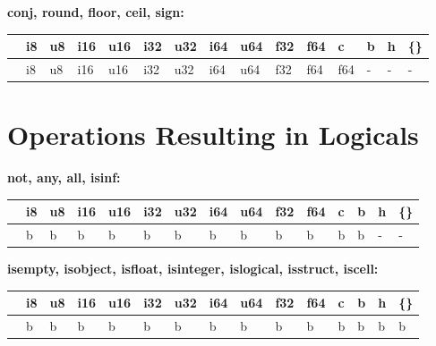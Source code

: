 \textbf{conj, round, floor, ceil, sign:}
\begin{scriptsize}\begin{tt}\begin{center}\vspace{-.3cm}\begin{tabular}{|m{.65cm}||m{.65cm}|m{.65cm}|m{.65cm}|m{.65cm}|m{.65cm}|m{.65cm}|m{.65cm}|m{.65cm}|m{.65cm}|m{.65cm}|m{.65cm}|m{.65cm}|m{.65cm}|m{.65cm}|}\hline 
&i8&u8&i16&u16&i32&u32&i64&u64&f32&f64&c&b&h&\{\}\\ \hline \hline
&i8&u8&i16&u16&i32&u32&i64&u64&f32&f64&f64&-&-&-\\ \hline
\end{tabular}\end{center}\end{tt}\end{scriptsize} 


\section{Operations Resulting in Logicals}

\textbf{not, any, all, isinf:}
\begin{scriptsize}\begin{tt}\begin{center}\vspace{-.3cm}\begin{tabular}{|m{.65cm}||m{.65cm}|m{.65cm}|m{.65cm}|m{.65cm}|m{.65cm}|m{.65cm}|m{.65cm}|m{.65cm}|m{.65cm}|m{.65cm}|m{.65cm}|m{.65cm}|m{.65cm}|m{.65cm}|}\hline 
&i8&u8&i16&u16&i32&u32&i64&u64&f32&f64&c&b&h&\{\}\\ \hline \hline
&b&b&b&b&b&b&b&b&b&b&b&b&-&-\\ \hline
\end{tabular}\end{center}\end{tt}\end{scriptsize} 

\textbf{isempty, isobject, isfloat, isinteger, islogical, isstruct, iscell:}
\begin{scriptsize}\begin{tt}\begin{center}\vspace{-.3cm}\begin{tabular}{|m{.65cm}||m{.65cm}|m{.65cm}|m{.65cm}|m{.65cm}|m{.65cm}|m{.65cm}|m{.65cm}|m{.65cm}|m{.65cm}|m{.65cm}|m{.65cm}|m{.65cm}|m{.65cm}|m{.65cm}|}\hline 
&i8&u8&i16&u16&i32&u32&i64&u64&f32&f64&c&b&h&\{\}\\ \hline \hline
&b&b&b&b&b&b&b&b&b&b&b&b&b&b\\ \hline
\end{tabular}\end{center}\end{tt}\end{scriptsize} 

